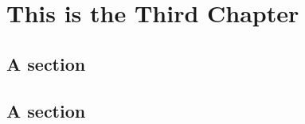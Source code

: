 \documentclass[../ThesisMain]{subfiles}
\begin{document}
\doublespacing%
\chapter{This is the Third Chapter}\label{chap:3}
\section{A section}  
\lipsum[0-1]

\section{A section}
\lipsum[0-1]
\end{document}
